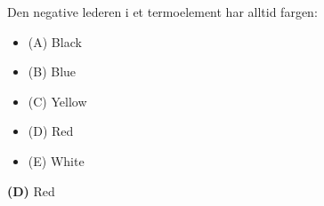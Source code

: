 

Den negative lederen i et termoelement har alltid fargen:

\begin{itemize}
\item{(A)} Black
\vskip 5pt 
\item{(B)} Blue
\vskip 5pt 
\item{(C)} Yellow
\vskip 5pt 
\item{(D)} Red
\vskip 5pt 
\item{(E)} White
\end{itemize}







{\bf (D)} Red
 









